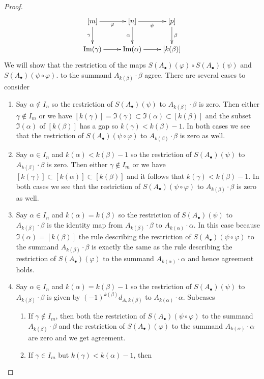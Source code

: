 \begin{proof}
$$\xymatrix{
[m] \ar[r]_\varphi \ar[d]_\gamma &
[n] \ar[r]_\psi \ar[d]_\alpha &
[p] \ar[d]^\beta \\
\Im(\gamma) \ar[r] &
\Im(\alpha) \ar[r] &
[k(\beta)]
}
$$
We will show that the restriction of the maps
$S(A_\bullet)(\varphi) \circ S(A_\bullet)(\psi)$ and
$S(A_\bullet)(\psi \circ \varphi)$.
to the summand $A_{k(\beta)} \cdot \beta$ agree.
There are several cases to consider
\begin{enumerate}
\item Say $\alpha \not \in I_n$ so the restriction of
$S(A_\bullet)(\psi)$ to $A_{k(\beta)} \cdot \beta$ is zero.
Then either $\gamma \not \in I_m$ or we have
$[k(\gamma)] = \Im(\gamma) \subset \Im(\alpha) \subset [k(\beta)]$
and the subset $\Im(\alpha)$ of $[k(\beta)]$ has a gap so
$k(\gamma) < k(\beta) - 1$. In both cases we see that
the restriction of
$S(A_\bullet)(\psi \circ \varphi)$ to $A_{k(\beta)} \cdot \beta$
is zero as well.
\item Say $\alpha \in I_n$ and $k(\alpha) < k(\beta) - 1$ so the restriction of
$S(A_\bullet)(\psi)$ to $A_{k(\beta)} \cdot \beta$ is zero.
Then either $\gamma \not \in I_m$ or we have
$[k(\gamma)] \subset [k(\alpha)] \subset [k(\beta)]$
and it follows that $k(\gamma) < k(\beta) - 1$. In both cases we see that
the restriction of
$S(A_\bullet)(\psi \circ \varphi)$ to $A_{k(\beta)} \cdot \beta$
is zero as well.
\item Say $\alpha \in I_n$ and $k(\alpha) = k(\beta)$ so the restriction of
$S(A_\bullet)(\psi)$ to $A_{k(\beta)} \cdot \beta$ is
the identity map from $A_{k(\beta)} \cdot \beta$ to
$A_{k(\alpha)} \cdot \alpha$. In this case because $\Im(\alpha) =[k(\beta)]$
the rule describing the restriction of $S(A_\bullet)(\psi \circ \varphi)$
to the summand $A_{k(\beta)} \cdot \beta$ is exactly the same
as the rule describing the restriction of $S(A_\bullet)(\varphi)$
to the summand $A_{k(\alpha)} \cdot \alpha$ and hence agreement holds.
\item Say $\alpha \in I_n$ and $k(\alpha) = k(\beta) - 1$
so the restriction of $S(A_\bullet)(\psi)$ to $A_{k(\beta)} \cdot \beta$
is given by $(-1)^{k(\beta)}d_{A, k(\beta)}$ to $A_{k(\alpha)} \cdot \alpha$.
Subcases
\begin{enumerate}
\item If $\gamma \not \in I_m$, then both the restriction of
$S(A_\bullet)(\psi \circ \varphi)$ to the summand $A_{k(\beta)} \cdot \beta$
and the restriction of $S(A_\bullet)(\varphi)$ to the summand
$A_{k(\alpha)} \cdot \alpha$ are zero and we get agreement.
\item If $\gamma \in I_m$ but $k(\gamma) < k(\alpha) - 1$, then

\end{enumerate}
\end{enumerate}
\end{proof}
